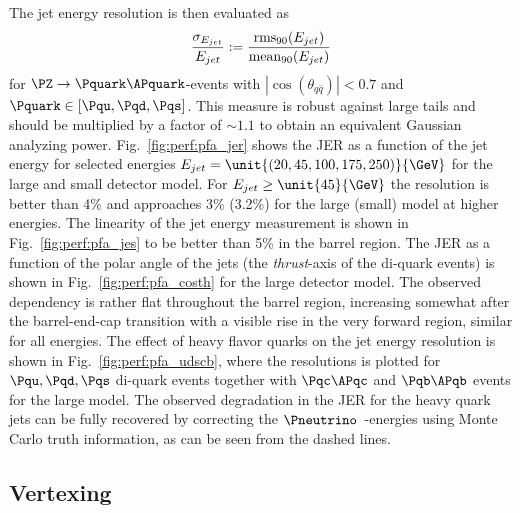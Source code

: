 %
%
The jet energy resolution is then evaluated as 
\begin{equation}\label{ild:eq:jer}
\frac{ \sigma_{E_{jet}} } { E_{jet}}  :=  \frac{\mathrm{rms}_{90}(E_{jet})}{ \mathrm{mean}_{90}(E_{jet})}
\end{equation}
for $\PZ\rightarrow \Pquark\APquark$-events with $|\cos(\theta_{q\bar q})|<0.7$ and $\Pquark \in [\Pqu,\Pqd,\Pqs]$. This measure is robust against large tails and
should be multiplied by a factor of $\sim1.1$ to obtain an equivalent Gaussian analyzing power\cite{ild:bib:PandoraPFA}.
Fig.~\ref{fig:perf:pfa_jer} shows the JER as a function of the jet energy for selected energies $E_{jet}=\unit{(20, 45, 100, 175, 250)}{\GeV}$
for the large and small detector model. For $E_{jet}\geq \unit{45}{\GeV}$ the resolution is better than 4\% and approaches 3\% (3.2\%) for the large (small) model
at higher energies. The linearity of the jet energy measurement is shown in Fig.~\ref{fig:perf:pfa_jes} to be better than 5\% in the barrel region.
The JER as a function of the polar angle of the jets (the {\em thrust}-axis of the di-quark events) is shown in Fig.~\ref{fig:perf:pfa_costh} for the
large detector model. The observed dependency is rather flat throughout the barrel region, increasing somewhat after the barrel-end-cap transition
with a visible rise in the very forward region, similar for all energies. The effect of heavy flavor quarks on the jet energy resolution is shown in
Fig.~\ref{fig:perf:pfa_udscb}, where the resolutions is plotted for $\Pqu,\Pqd,\Pqs$ di-quark events together with $\Pqc\APqc$ and $\Pqb\APqb$ events for the large model.
The observed degradation in the JER for the heavy quark jets can be fully recovered by correcting the $\Pneutrino$~-energies using Monte Carlo truth
information, as can be seen from the dashed lines.



\subsection{Vertexing}

